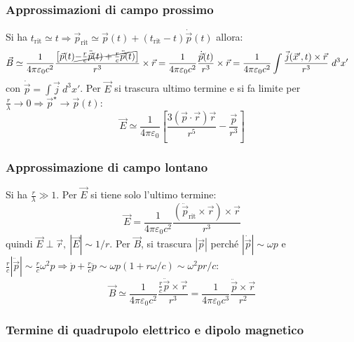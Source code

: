 \documentclass[a4paper]{scrartcl}
\numberwithin{equation}{subsection}
\theoremstyle{style1}
\begin{document}
\subsubsection{Approssimazioni di campo prossimo}
Si ha $t_\text{rit}\simeq t\Rightarrow \vec{p}_\text{rit}\simeq \vec{p}(t) + (t_\text{rit}-t) \dot{\vec{p}}(t) $ allora:
\begin{equation}
	\begin{split}
		&\vec{B} \simeq \frac{1}{4\pi \varepsilon _0 c^2} \frac{\left[ \vec{p}(t) \cancel{- \frac{r}{c}\ddot{\vec{p}}(t) + \frac{r}{c}\ddot{\vec{p}}(t)} \right] }{r^3} \times \vec{r}=\frac{1}{4\pi \varepsilon _0 c^2}\frac{\dot{\vec{p}}(t)}{r^3}\times \vec{r}=\frac{1}{4\pi \varepsilon _0 c^2}\int \frac{\vec{j}(\vec{x}',t) \times \vec{r}}{r^3}\ d^3 x' 
	\end{split}
\end{equation}
con $\dot{\vec{p}} = \int \vec{j}\ d^3 x' $. Per $\vec{E}$ si trascura ultimo termine e si fa limite per $\frac{r}{\lambda }\to 0 \Rightarrow \vec{p}^\star \to \vec{p}(t)$:
\begin{equation}
	\vec{E}\simeq \frac{1}{4\pi \varepsilon _0} \left[ \frac{3 (\vec{p}\cdot \vec{r}) \vec{r}}{r^5} - \frac{\vec{p}}{r^3} \right] 
\end{equation}
\subsubsection{Approssimazione di campo lontano}
Si ha $\frac{r}{\lambda } \gg 1$. Per $\vec{E}$ si tiene solo l'ultimo termine:
\begin{equation}
	\vec{E} = \frac{1}{4\pi \varepsilon _0 c^2} \frac{(\ddot{\vec{p}}_\text{rit} \times \vec{r}) \times \vec{r}}{r^3}
\end{equation}
quindi $\vec{E}\perp \vec{r}, \ |\vec{E} |\sim 1 / r$. Per $\vec{B}$, si trascura $\left\lvert \vec{p} \right\rvert $ perch\'e $| \dot{\vec{p}} |\sim \omega p$ e $\frac{r}{c} | \ddot{\vec{p}} | \sim \frac{r}{c}\omega^2 p\Rightarrow \dot{p}+ \frac{r}{c}\ddot{p}\sim \omega p (1+ r\omega/ c)\sim\omega^2 p  r / c $:
\begin{equation}
	\vec{B}\simeq \frac{1}{4 \pi \varepsilon _0 c^2 } \frac{\frac{r}{c}\ddot{\vec{p}} \times  \vec{r}}{r^3} = \frac{1}{4\pi \varepsilon _0 c^3} \frac{\ddot{\vec{p}}\times \vec{r}}{r^2}
\end{equation}
\subsubsection{Termine di quadrupolo elettrico e dipolo magnetico}
\end{document}
